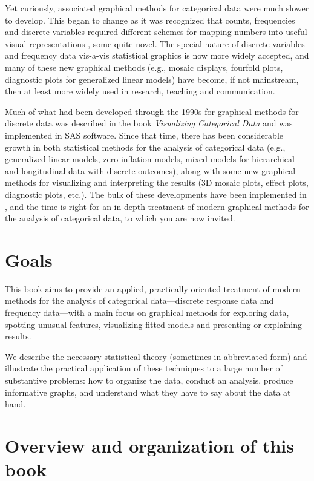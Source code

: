 Yet curiously, associated graphical methods for categorical data were 
much slower to develop. This began to change as it was recognized that
counts, frequencies and discrete variables required different
schemes for mapping numbers into useful visual representations \citep{Friendly:95,Friendly:97},
some quite novel.
The special nature of discrete variables
and frequency data vis-a-vis statistical graphics is now more widely accepted,
and many of these new graphical methods (e.g., mosaic displays, fourfold plots, diagnostic
plots for generalized linear models) have become, if not mainstream, then at
least more widely used in research, teaching and communication.

Much of what had been developed through the 1990s for graphical methods for
discrete data was described in the book \emph{Visualizing Categorical Data}
\citep{Friendly:00:VCD} and was implemented in SAS\textsuperscript{\textregistered} software. 
Since that time,  
there has been considerable growth in both statistical methods for the
analysis of categorical data (e.g., generalized linear models, zero-inflation
models, mixed models for hierarchical and longitudinal data with discrete
outcomes), along with some new graphical methods for visualizing and
interpreting the results (3D mosaic plots, effect plots, diagnostic plots, etc.). 
The bulk of these developments have been implemented in \R, and the time is
right for an in-depth treatment of modern graphical methods for the analysis
of categorical data, to which you are now invited.

\section*{Goals}
This book aims to provide an applied, practically-oriented treatment of 
modern methods for the analysis of categorical data---discrete response data
and frequency data---with a main focus on graphical methods for exploring data,
spotting unusual features, visualizing fitted models and presenting or explaining
results.

We describe the necessary statistical theory (sometimes in abbreviated form)
and illustrate the practical application of these techniques to a large number
of substantive problems: how to organize the data, conduct an analysis, 
produce informative graphs, and understand what they have to say about the
data at hand.  

\section*{Overview and organization of this book}

 

